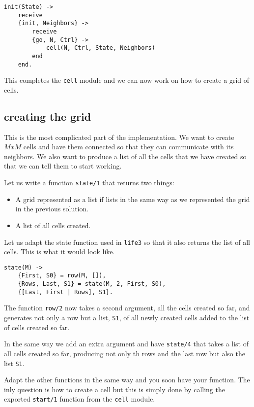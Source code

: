 \documentclass[a4paper,11pt]{article}
\begin{document}
\begin{verbatim}
init(State) ->
    receive
	{init, Neighbors} ->
	    receive
		{go, N, Ctrl} ->
		    cell(N, Ctrl, State, Neighbors)
	    end
    end.
\end{verbatim}

This completes the {\tt cell} module and we can now work on how to
create a grid of cells.

\subsection{creating the grid}

This is the most complicated part of the implementation. We want to
create $MxM$ cells and have them connected so that they can
communicate with its neighbors. We also want to produce a list of all
the cells that we have created so that we can tell them to start working. 

Let us write a function {\tt state/1} that returns two things: 

\begin{itemize}
\item A grid represented as a list if lists in the same way as we
  represented the grid in the previous solution.
\item A list of all cells created. 
\end{itemize}

Let us adapt the state function used in {\tt life3} so that it also
returns the list of all cells. This is what it would look like. 

\begin{verbatim}
state(M) ->
    {First, S0} = row(M, []),
    {Rows, Last, S1} = state(M, 2, First, S0),
    {[Last, First | Rows], S1}.
\end{verbatim}


The function {\tt row/2} now takes a second argument, all the cells
created so far, and generates not only a row but a list, {\tt S1}, of
all newly created cells added to the list of cells created so far.

In the same way we add an extra argument and have {\tt state/4} that
takes a list of all cells created so far, producing not only th rows
and the last row but also the list {\tt S1}. 

Adapt the other functions in the same way and you soon have your
function. The inly question is how to create a cell but this is
simply done by calling the exported {\tt start/1} function from the
{\tt cell} module.
\end{document}
